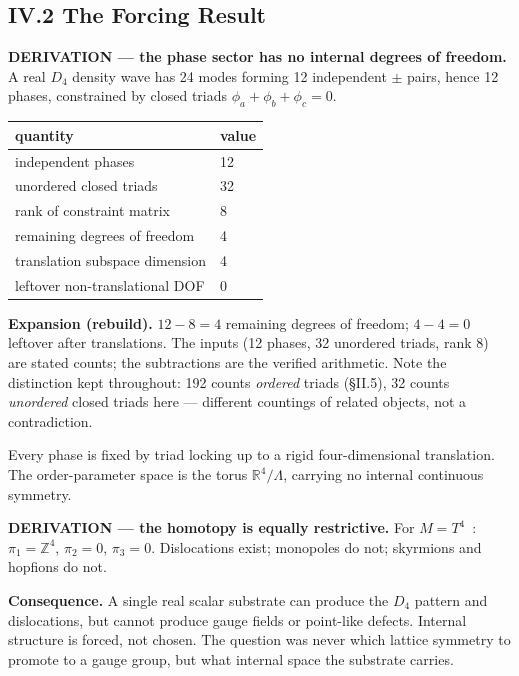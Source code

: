 \documentclass[11pt,a4paper]{article}
\newcommand{\expansion}[1]{\par\smallskip\noindent\textbf{Expansion (rebuild).} #1\par\smallskip}
\begin{document}
\subsection{IV.2 The Forcing Result}
\textbf{DERIVATION --- the phase sector has no internal degrees of freedom.} A real $D_4$ density wave has 24 modes forming 12 independent $\pm$ pairs, hence 12 phases, constrained by closed triads $\phi_a + \phi_b + \phi_c = 0$.
\begin{center}
\begin{tabular}{ll}
\toprule
quantity & value \\
\midrule
independent phases & 12 \\
unordered closed triads & 32 \\
rank of constraint matrix & 8 \\
remaining degrees of freedom & 4 \\
translation subspace dimension & 4 \\
leftover non-translational DOF & 0 \\
\bottomrule
\end{tabular}
\end{center}
\expansion{$12 - 8 = 4$ remaining degrees of freedom; $4 - 4 = 0$ leftover after translations. The inputs (12 phases, 32 unordered triads, rank 8) are stated counts; the subtractions are the verified arithmetic. Note the distinction kept throughout: 192 counts \emph{ordered} triads (\S II.5), 32 counts \emph{unordered} closed triads here --- different countings of related objects, not a contradiction.}
Every phase is fixed by triad locking up to a rigid four-dimensional translation. The order-parameter space is the torus $\mathbb{R}^4/\Lambda$, carrying no internal continuous symmetry.

\textbf{DERIVATION --- the homotopy is equally restrictive.} For $M = T^4$~\cite{mermin1979}: $\pi_1 = \mathbb{Z}^4$, $\pi_2 = 0$, $\pi_3 = 0$. Dislocations exist; monopoles do not; skyrmions and hopfions do not.

\textbf{Consequence.} A single real scalar substrate can produce the $D_4$ pattern and dislocations, but cannot produce gauge fields or point-like defects. Internal structure is forced, not chosen. The question was never which lattice symmetry to promote to a gauge group, but what internal space the substrate carries.
\end{document}
